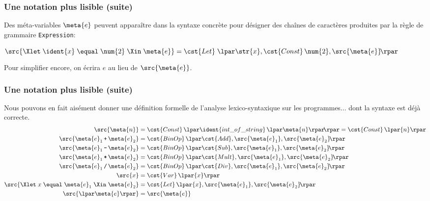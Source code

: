 %
\begin{frame}
\frametitle{Une notation plus lisible (suite)}

Des méta-variables $\meta{e}$ peuvent apparaître dans la syntaxe
concrète pour désigner des chaînes de caractères produites par la
règle de grammaire \texttt{Expression}:

\centerline{$\src{\Xlet \; \ident{x} \; \equal \; \num{2} \; \Xin
\; \meta{e}} = \cst{Let} \; \lpar\str{x}, \cst{Const} \, \num{2},
\src{\meta{e}}\!\rpar$}

\bigskip

Pour simplifier encore, on écrira $e$ au lieu de $\src{\meta{e}}$.

\end{frame}

%
\begin{frame}
\frametitle{Une notation plus lisible (suite)}

Nous pouvons en fait aisément donner une définition formelle de
l'analyse lexico-syntaxique sur les programmes... dont la syntaxe est
déjà correcte.
\begin{align*}
\src{\meta{n}} & = \cst{Const} \, \lpar\ident{int\_of\_string} \,
\lpar\meta{n}\rpar\!\rpar = \cst{Const} \, \lpar{n}\rpar\\
\src{\meta{e}_1 \, \texttt{+} \, \meta{e}_2} & = \cst{BinOp} \,
\lpar\cst{Add}, \src{\meta{e}_1}, \src{\meta{e}_2}\!\rpar\\
\src{\meta{e}_1 \, \texttt{-} \, \meta{e}_2} & = \cst{BinOp} \,
\lpar\cst{Sub}, \src{\meta{e}_1}, \src{\meta{e}_2}\!\rpar\\
\src{\meta{e}_1 \, \texttt{*} \, \meta{e}_2} & = \cst{BinOp} \,
\lpar\cst{Mult}, \src{\meta{e}_1}, \src{\meta{e}_2}\!\rpar\\
\src{\meta{e}_1 \, \texttt{/} \, \meta{e}_2} & = \cst{BinOp} \,
\lpar\cst{Div}, \src{\meta{e}_1}, \src{\meta{e}_2}\!\rpar\\
\src{x} & = \cst{Var} \, \lpar{x}\rpar\\
\src{\Xlet \; x \; \equal \; \meta{e}_1 \; \Xin \;
  \meta{e}_2} & = \cst{Let} \, \lpar{x}, \src{\meta{e}_1},
\src{\meta{e}_2}\!\rpar\\
\src{\lpar\meta{e}\rpar} & = \src{\meta{e}}
\end{align*}

\end{frame}

